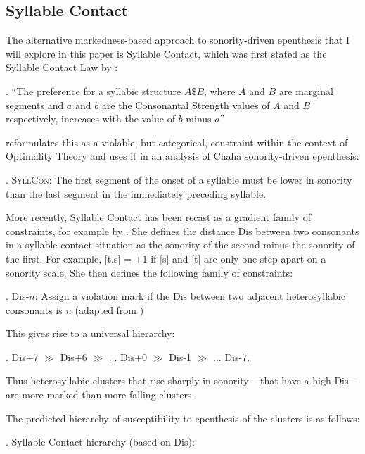 \documentclass[12pt]{article}
\begin{document}
\subsection{Syllable Contact} 

The alternative markedness-based approach to sonority-driven epenthesis that I will explore in this paper is Syllable Contact, which was first stated as the Syllable Contact Law by \citet{murray.vennemann.1983}:

\ex. ``The preference for a syllabic structure $A$\$$B$, where $A$ and $B$ are marginal segments and $a$ and $b$ are the Consonantal Strength
values of $A$ and $B$ respectively, increases with the value of $b$ minus $a$'' \citep{murray.vennemann.1983}

\citet{rose.2000} reformulates this as a violable, but categorical, constraint within the context of Optimality Theory and uses it in an analysis of Chaha sonority-driven epenthesis:

\ex.  \textsc{SyllCon}: The first segment of the onset of a syllable must be lower in sonority than the last segment in the immediately preceding syllable.

More recently, Syllable Contact has been recast as a gradient family of constraints, for example by \citet{gouskova.2002, gouskova.2004}.  She defines the distance {\sc Dis} between two consonants in a syllable contact situation as the sonority of the second minus the sonority of the first.  For example, [t.s] = +1 if [s] and [t] are only one step apart on a sonority scale.  She then defines the following family of constraints:

\ex. {\sc *Dis-}$n$: Assign a violation mark if the {\sc Dis} between two adjacent heterosyllabic consonants is $n$ (adapted from \citep{gouskova.2002})

This gives rise to a universal hierarchy:

\ex. {\sc *Dis+7} $\gg$ {\sc *Dis+6} $\gg$ ... {\sc *Dis+0} $\gg$ {\sc *Dis-1} $\gg$ ... {\sc *Dis-7}.

Thus heterosyllabic clusters that rise sharply in sonority -- that have a high {\sc Dis} -- are more marked than more falling clusters.

The predicted hierarchy of susceptibility to epenthesis of the clusters is as follows:

\ex. Syllable Contact hierarchy (based on {\sc *Dis}):

\vspace{-3em}
\noindent \resizebox{\linewidth}{!}{\usebox{\syllablecontacthierarchy}}
\end{document}
